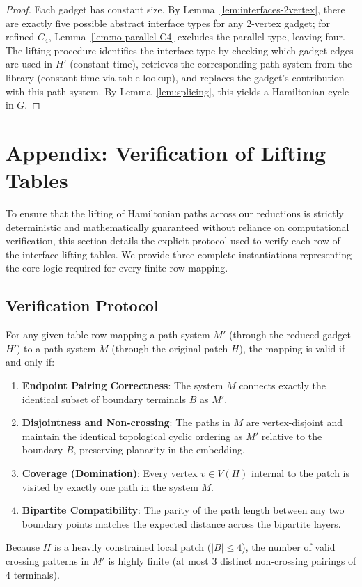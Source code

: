 \documentclass[12pt]{article}
\theoremstyle{definition}
\begin{document}
\begin{proof}
Each gadget has constant size. By Lemma~\ref{lem:interfaces-2vertex}, there are exactly five possible abstract interface types for any 2-vertex gadget; for refined $C_4$, Lemma~\ref{lem:no-parallel-C4} excludes the parallel type, leaving four.
The lifting procedure identifies the interface type by checking which gadget edges are used in $H'$ (constant time), retrieves the corresponding path system from the library (constant time via table lookup), and replaces the gadget's contribution with this path system.
By Lemma~\ref{lem:splicing}, this yields a Hamiltonian cycle in $G$.
\end{proof}


\section{Appendix: Verification of Lifting Tables}
\label{sec:appendix-lifting-tables}

To ensure that the lifting of Hamiltonian paths across our reductions is strictly deterministic and mathematically guaranteed without reliance on computational verification, this section details the explicit protocol used to verify each row of the interface lifting tables. We provide three complete instantiations representing the core logic required for every finite row mapping.

\subsection{Verification Protocol}
For any given table row mapping a path system $M'$ (through the reduced gadget $H'$) to a path system $M$ (through the original patch $H$), the mapping is valid if and only if:
\begin{enumerate}
    \item \textbf{Endpoint Pairing Correctness}: The system $M$ connects exactly the identical subset of boundary terminals $B$ as $M'$.
    \item \textbf{Disjointness and Non-crossing}: The paths in $M$ are vertex-disjoint and maintain the identical topological cyclic ordering as $M'$ relative to the boundary $B$, preserving planarity in the embedding.
    \item \textbf{Coverage (Domination)}: Every vertex $v \in V(H)$ internal to the patch is visited by exactly one path in the system $M$.
    \item \textbf{Bipartite Compatibility}: The parity of the path length between any two boundary points matches the expected distance across the bipartite layers.
\end{enumerate}
Because $H$ is a heavily constrained local patch ($|B| \le 4$), the number of valid crossing patterns in $M'$ is highly finite (at most 3 distinct non-crossing pairings of 4 terminals). 
\end{document}
